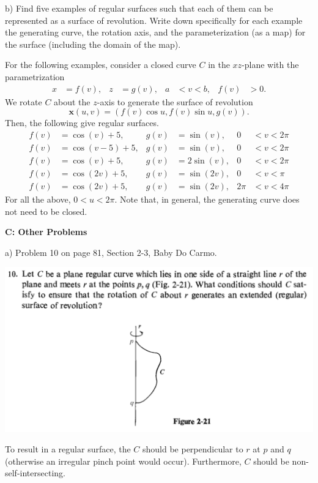 \documentclass[10pt,letterpaper]{hmcpset}
\begin{document}
\newpage
\begin{problem}
b) Find five examples of regular surfaces such that each of 
them can be represented as a surface of revolution.  Write down
specifically for each example the generating curve, the rotation 
axis, and the parameterization (as a map) for the surface (including
the domain of the map).
\end{problem}
\begin{solution}
For the following examples, consider a closed curve $C$ in the $xz$-plane with the parametrization
\begin{align*}
    x &= f(v),& z &= g(v),& a&< v < b,& f(v) &>0.
\end{align*}
We rotate $C$ about the $z$-axis to generate the surface of revolution
\[
\mathbf{x}(u,v) = (f(v)\cos u, f(v) \sin u, g(v)).
\]
Then, the following give regular surfaces.
\begin{align*}
    f(v) &= \cos(v) + 5,& g(v) &= \sin(v),& 0 &< v <2\pi\\
    f(v) &= \cos(v - 5) + 5,& g(v) &= \sin(v),& 0 &< v <2\pi\\
    f(v) &= \cos(v) + 5,& g(v) &= 2\sin(v),& 0 &< v <2\pi\\
    f(v) &= \cos(2v) + 5,& g(v) &= \sin(2v),& 0 &< v <\pi \\
    f(v) &= \cos(2v) + 5,& g(v) &= \sin(2v),& 2\pi &< v <4\pi
\end{align*}
For all the above, $0 < u < 2\pi$. Note that, in general, the generating curve does not need to be closed.
\end{solution}

\newpage
\textbf{C: Other Problems}

\begin{problem}
a) Problem 10 on page 81, Section 2-3, Baby Do Carmo.

\includegraphics[scale=0.7]{Ca.png}
\end{problem}
\begin{solution}
To result in a regular surface, the $C$ should be perpendicular to $r$ at $p$ and $q$ (otherwise an irregular pinch point would occur). Furthermore, $C$ should be non-self-intersecting.
\end{solution}
\end{document}
